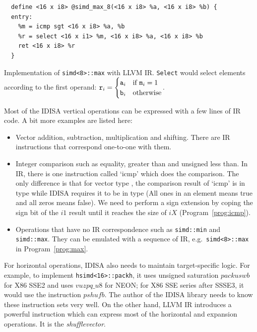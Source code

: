 \begin{program}
\begin{verbatim}
  define <16 x i8> @simd_max_8(<16 x i8> %a, <16 x i8> %b) {
  entry:
    %m = icmp sgt <16 x i8> %a, %b
    %r = select <16 x i1> %m, <16 x i8> %a, <16 x i8> %b
    ret <16 x i8> %r
  }
\end{verbatim}
\caption[Implementation of {\tt simd<8>::max} with LLVM IR]{Implementation of {\tt simd<8>::max} with LLVM IR. {\tt Select} would select elements according to the first operand: $\text{\tt r}_i=
\begin{cases}
    \text{\tt a}_i& \text{if } \text{\tt m}_i = 1\\
    \text{\tt b}_i& \text{otherwise}
\end{cases}$.}
\label{prog:max}
\end{program}

Most of the IDISA vertical operations can be expressed with a few lines of IR code. A bit more examples are listed here:

\begin{itemize}
    \item Vector addition, subtraction, multiplication and shifting. There are IR instructions that correspond one-to-one with them.
    \item Integer comparison such as equality, greater than and unsigned less than. In IR, there is one instruction called `icmp' which does the comparison. The only difference is that for vector type {\tt <N x iX>}, the comparison result of `icmp' is in type {\tt <N x i1>} while IDISA requires it to be in type {\tt <N x iX>} (All ones in an element means true and all zeros means false). We need to perform a sign extension by coping the sign bit of the $i1$ result until it reaches the size of $iX$ (Program~\ref{prog:icmp}).
    \item Operations that have no IR correspondence such as {\tt simd::min} and {\tt simd::max}. They can be emulated with a sequence of IR, e.g.\ {\tt simd<8>::max} in Program~\ref{prog:max}.
\end{itemize}

For horizontal operations, IDISA also needs to maintain target-specific logic. For example, to implement {\tt hsimd<16>::packh}, it uses unsigned saturation $packuswb$ for X86 SSE2 and uses $vuzpq\_u8$ for NEON; for X86 SSE series after SSSE3, it would use the instruction $pshufb$. The author of the IDISA library needs to know these instruction sets very well. On the other hand, LLVM IR introduces a powerful instruction which can express most of the horizontal and expansion operations. It is the \textit{shufflevector}.

